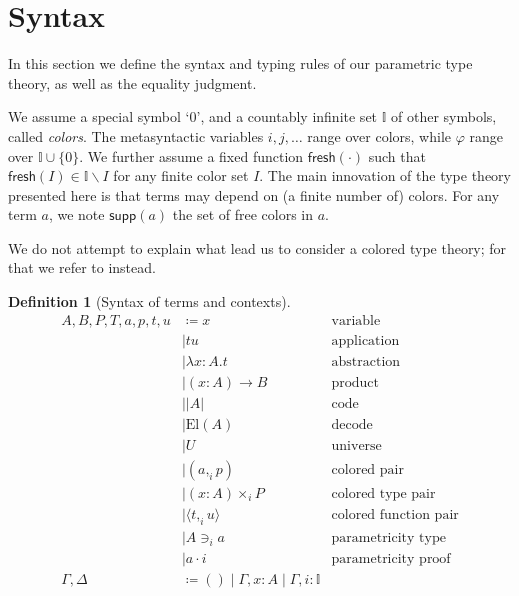 \documentclass[english]{PaperTools/latex/entcs}
\theoremstyle{plain}
\theoremstyle{definition}
\newtheorem{definition}[theorem]{Definition}
\theoremstyle{remark}
\newcommand\CP[3]{(#2,_{#1} #3)}
\newcommand\CTimes[2]{(#2) ×_{#1}}
\newcommand\param[1]{\!\cdot\!#1}
\newcommand\op[1]{∋_{#1}}
\newcommand\fp[3]{⟨#2 ,_{#1} #3⟩}
\def\fresh#1{\mathsf{fresh}(#1)}
\def\support#1{\mathsf{supp}(#1)}
\def\El#1{\mathrm{El}(#1)}
\begin{document}
\section{Syntax}
\label{sec:syntax}
In this section we define the syntax and typing rules of our
parametric type theory, as well as the equality judgment.

We assume a special symbol ‘0’, and a countably infinite set $𝕀$ of
other symbols, called \emph{colors}.
The metasyntactic variables $i,j,\ldots$ range over colors,
while $φ$ range over $𝕀 ∪ \{0\}$.
We further assume a fixed function $\fresh{·}$ such that
$\fresh{I} ∈ 𝕀 \backslash I$ for any finite color set $I$.
%
The main innovation of the type theory
presented here is that terms may depend on (a finite number of)
colors.  For any term $a$, we note $\support{a}$ the set of free colors
in $a$.

We do not attempt to explain what lead us to consider a colored type
theory; for that we refer to \cite{bernardy_type-theory_2013} instead.
\begin{definition}[Syntax of terms and contexts]
  \begin{align*}
    A,B,P,T,a,p,t,u
            & \coloneqq x & \text {variable} \\
            & \mid t u & \text{application} \\
            & \mid λx:A. t & \text{abstraction} \\
            & \mid (x:A) → B & \text{product} \\
%
            & \mid |A| & \text{code} \\
            & \mid \El{A} & \text{decode} \\
            & \mid U & \text{universe} \\
%
            & \mid \CP i a p & \text{colored pair} \\
            & \mid \CTimes i {x:A} P & \text{colored type pair} \\
            & \mid \fp i t u & \text{colored function pair}\\
            & \mid A \op i a & \text{parametricity type} \\
            & \mid a \param i & \text{parametricity proof} \\
    \Gamma,\Delta & \coloneqq () \mid \Gamma,x:A \mid \Gamma,i:𝕀
  \end{align*}
\end{definition}
\end{document}
